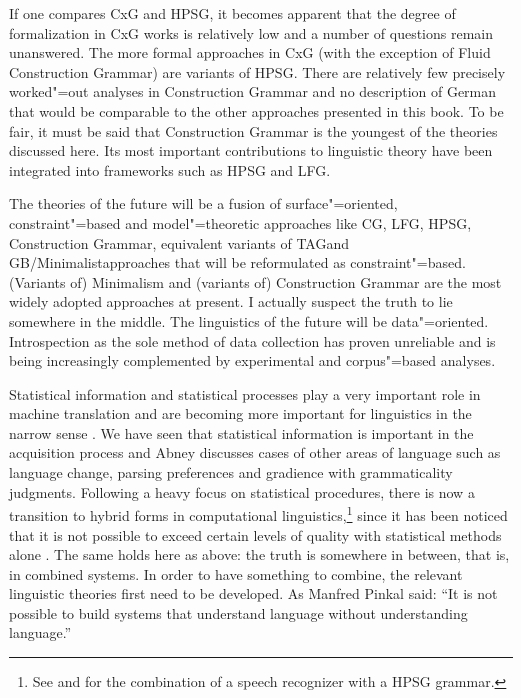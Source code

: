 If one compares CxG and HPSG, it becomes apparent that the degree of formalization in CxG works is relatively low and a number of questions remain
unanswered. The more formal approaches in CxG (with the exception of Fluid Construction Grammar) are variants of HPSG. There are relatively few precisely worked"=out analyses in Construction Grammar
and no description of German that would be comparable to the other approaches presented in this
book. To be fair, it must be said that Construction Grammar
is the youngest of the theories discussed here. Its most important contributions to linguistic theory have been integrated into frameworks such as HPSG and LFG.

The theories of the future will be a fusion of surface"=oriented, constraint"=based and
model"=theoretic approaches like CG\indexcg, LFG\indexlfg, HPSG\indexhpsg,
Construction Grammar\indexcxg, equivalent variants of TAG\indextag and GB/Minimalist\indexgb\indexmp approaches that will be reformulated as constraint"=based.
(Variants of) Minimalism and (variants of) Construction Grammar are the most widely adopted approaches at present. I actually suspect the truth to lie somewhere
in the middle. The linguistics of the future will be data"=oriented. Introspection as the sole method of data collection
has proven unreliable \citep{Mueller2007c,MM2009a} and is being increasingly complemented by experimental and corpus"=based analyses.

Statistical information and statistical processes play a very important role in machine translation and are becoming more important
for linguistics in the narrow sense
\citep{Abney96a}. We
have seen that statistical information is important in the acquisition process and Abney discusses cases of other
areas of language such as language change, parsing preferences and gradience with grammaticality judgments.
Following a heavy focus on statistical procedures, there is now a transition to hybrid forms in computational linguistics,\footnote{%
See  and  for the combination of a speech recognizer with a HPSG grammar.
}
since it has been noticed that it is not possible to exceed certain levels of quality with statistical methods alone \citep{Steedman2011a,Church2011a,Kay2011a}. 
The same holds here as above: the truth is somewhere in between, that is, in combined systems. In order to have something to combine, the relevant linguistic theories first
need to be developed. As Manfred Pinkal said: ``It is not possible to build systems that understand language without understanding language.''


